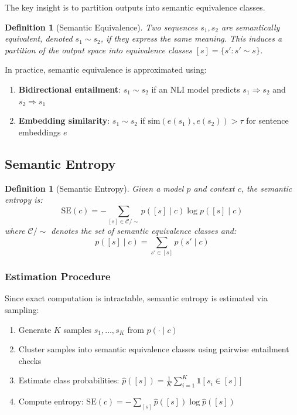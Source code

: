 \documentclass[11pt]{article}
\newtheorem{definition}[theorem]{Definition}
\begin{document}
The key insight is to partition outputs into semantic equivalence classes.

\begin{definition}[Semantic Equivalence]
Two sequences $s_1, s_2$ are semantically equivalent, denoted $s_1 \sim s_2$, if they express the same meaning. This induces a partition of the output space into equivalence classes $[s] = \{s' : s' \sim s\}$.
\end{definition}

In practice, semantic equivalence is approximated using:
\begin{enumerate}
    \item \textbf{Bidirectional entailment}: $s_1 \sim s_2$ if an NLI model predicts $s_1 \Rightarrow s_2$ and $s_2 \Rightarrow s_1$
    \item \textbf{Embedding similarity}: $s_1 \sim s_2$ if $\text{sim}(e(s_1), e(s_2)) > \tau$ for sentence embeddings $e$
\end{enumerate}

\subsection{Semantic Entropy}

\begin{definition}[Semantic Entropy]
Given a model $p$ and context $c$, the semantic entropy is:
\begin{equation}
\text{SE}(c) = -\sum_{[s] \in \mathcal{C}/{\sim}} p([s] \mid c) \log p([s] \mid c)
\end{equation}
where $\mathcal{C}/{\sim}$ denotes the set of semantic equivalence classes and:
\begin{equation}
p([s] \mid c) = \sum_{s' \in [s]} p(s' \mid c)
\end{equation}
\end{definition}

\subsubsection{Estimation Procedure}

Since exact computation is intractable, semantic entropy is estimated via sampling:

\begin{enumerate}
    \item Generate $K$ samples $s_1, \ldots, s_K$ from $p(\cdot \mid c)$
    \item Cluster samples into semantic equivalence classes using pairwise entailment checks
    \item Estimate class probabilities: $\hat{p}([s]) = \frac{1}{K}\sum_{i=1}^K \mathbf{1}[s_i \in [s]]$
    \item Compute entropy: $\widehat{\text{SE}}(c) = -\sum_{[s]} \hat{p}([s]) \log \hat{p}([s])$
\end{enumerate}
\end{document}
